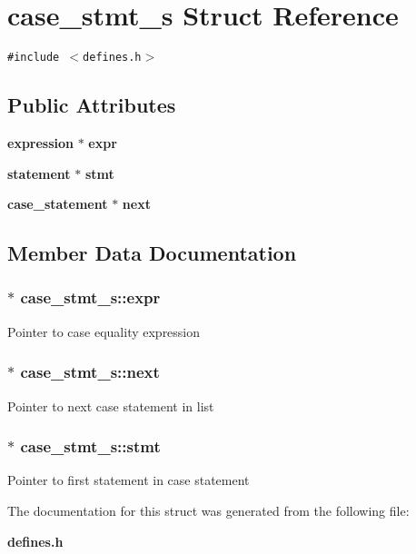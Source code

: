 \section{case\_\-stmt\_\-s  Struct Reference}
\label{structcase__stmt__s}
{\tt \#include $<$defines.h$>$}

\subsection*{Public Attributes}
\begin{CompactItemize}
\item 
{\bf expression} $\ast$ {\bf expr}
\item 
{\bf statement} $\ast$ {\bf stmt}
\item 
{\bf case\_\-statement} $\ast$ {\bf next}
\end{CompactItemize}


\subsection{Member Data Documentation}
\subsubsection{$\ast$ case\_\-stmt\_\-s::expr}\label{structcase__stmt__s_m0}


Pointer to case equality expression 
\subsubsection{$\ast$ case\_\-stmt\_\-s::next}\label{structcase__stmt__s_m2}


Pointer to next case statement in list 
\subsubsection{$\ast$ case\_\-stmt\_\-s::stmt}\label{structcase__stmt__s_m1}


Pointer to first statement in case statement 

The documentation for this struct was generated from the following file:\begin{CompactItemize}
\item 
{\bf defines.h}\end{CompactItemize}
